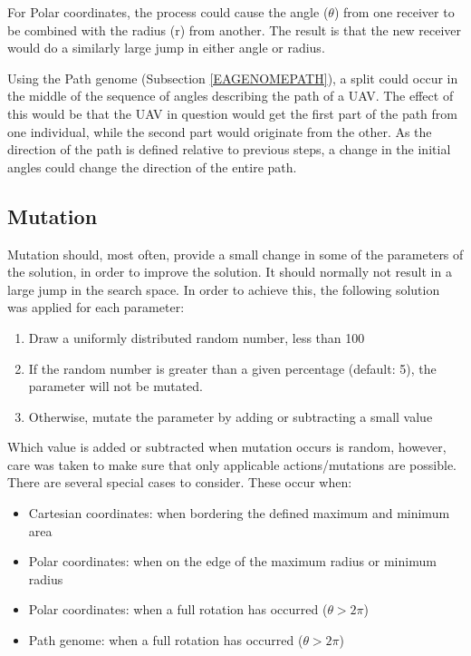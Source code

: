\documentclass[10pt,a4paper]{book}
\begin{document}
For Polar coordinates, the process could cause the angle ($\theta$) from one receiver to be combined with the radius (r) from another. The result is that the new receiver would do a similarly large jump in either angle or radius. 

Using the Path genome  (Subsection \ref{EAGENOMEPATH}), a split could occur in the middle of the sequence of angles describing the path of a \gls{UAV}. The effect of this would be that the \gls{UAV} in question would get the first part of the path from one individual, while the second part would originate from the other. As the direction of the path is defined relative to previous steps, a change in the initial angles could change the direction of the entire path.

\subsection{Mutation}
\label{EAMUTATION}
Mutation should, most often, provide a small change in some of the parameters of the solution, in order to improve the solution. It should normally not result in a large jump in the search space. In order to achieve this, the following solution was applied for each parameter:
\begin{enumerate}
\item Draw a uniformly distributed random number, less than 100
\item If the random number is greater than a given percentage (default: 5), the parameter will not be mutated.
\item Otherwise, mutate the parameter by adding or subtracting a small value
\end{enumerate}

Which value is added or subtracted when mutation occurs is random, however, care was taken to make sure that only applicable actions/mutations are possible. There are several special cases to consider. These occur when:

\begin{itemize}
\item Cartesian coordinates: when bordering the defined maximum and minimum area
\item Polar coordinates: when on the edge of the maximum radius or minimum radius
\item Polar coordinates: when a full rotation has occurred ($\theta > 2\pi$)
\item Path genome: when a full rotation has occurred ($\theta > 2\pi$)
\end{itemize}
\end{document}
